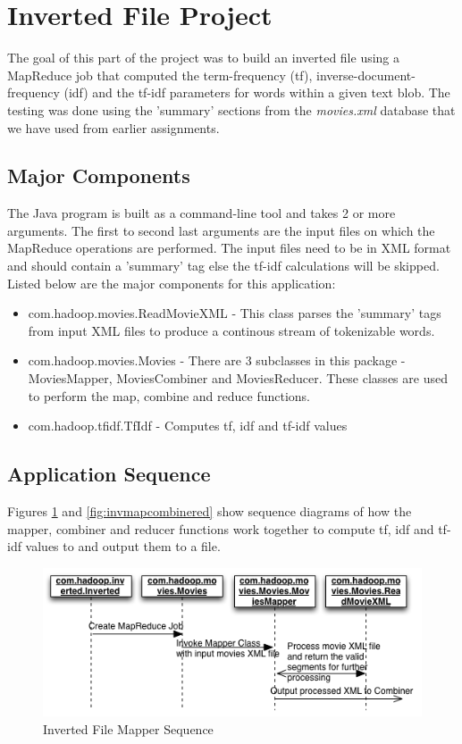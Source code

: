 \documentclass[IDF.tex]{subfiles}
\begin{document}
\section{Inverted File Project}
The goal of this part of the project was to build an inverted file using a MapReduce job that computed the term-frequency (tf), inverse-document-frequency (idf) and the tf-idf parameters for words within a given text blob. The testing was done using the 'summary' sections from the \textit{movies.xml} database that we have used from earlier assignments. 

\subsection{Major Components}

The Java program is built as a command-line tool and takes 2 or more arguments. The first to second last arguments are the input files on which the MapReduce operations are performed. The input files need to be in XML format and should contain a 'summary' tag else the tf-idf calculations will be skipped. Listed below are the major components for this application:
\begin{itemize}
\item com.hadoop.movies.ReadMovieXML - This class parses the 'summary' tags from input XML files to produce a continous stream of tokenizable words.
\item com.hadoop.movies.Movies - There are 3 subclasses in this package - MoviesMapper, MoviesCombiner and MoviesReducer. These classes are used to perform the map, combine and reduce functions.
\item com.hadoop.tfidf.TfIdf - Computes tf, idf and tf-idf values
\end{itemize}

\subsection{Application Sequence}
Figures \ref{fig:invmap} and \ref{fig:invmapcombinered} show sequence diagrams of how the mapper, combiner and reducer functions work together to compute tf, idf and tf-idf values to and output them to a file.

\begin{figure}[H]
	\centering
	\includegraphics[width=1\textwidth]{./Figures/InvFileMap.png}
	\caption{Inverted File Mapper Sequence}
	\label{fig:invmap}
\end{figure}
\end{document}
